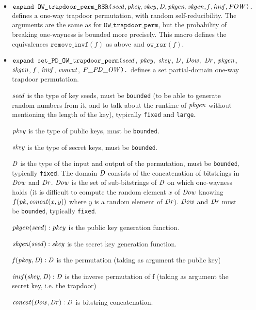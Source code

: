 \documentclass{article}
\begin{document}
\begin{itemize}
\item $\texttt{expand OW\_trapdoor\_perm\_RSR(}\mathit{seed}, \mathit{pkey}, \mathit{skey}, \mathit{D}, \mathit{pkgen}, \mathit{skgen}, \mathit{f}, \mathit{invf}, \mathit{POW}\texttt{).}$ defines a one-way trapdoor permutation, with random self-reducibility. The arguments are the same as for $\texttt{OW\_trapdoor\_perm}$, but the probability of breaking one-wayness is bounded more precisely. This macro defines the equivalences $\texttt{remove\_invf}(f)$ as above and $\texttt{ow\_rsr}(f)$.

\item $\texttt{expand set\_PD\_OW\_trapdoor\_perm(}\mathit{seed}$, $\mathit{pkey}$, $\mathit{skey}$, $\mathit{D}$, $\mathit{Dow}$, $\mathit{Dr}$, $\mathit{pkgen}$, $\mathit{skgen}$, $\mathit{f}$, $\mathit{invf}$, $\mathit{concat}$, $\mathit{P\_PD\_OW}\texttt{).}$ defines a set partial-domain one-way trapdoor permutation.

   $\mathit{seed}$ is the type of key seeds, must be \texttt{bounded} (to be able to generate random numbers from it, and to talk about
  the runtime of $\mathit{pkgen}$ without mentioning the length of the key), typically \texttt{fixed} and \texttt{large}.

   $\mathit{pkey}$ is the type of public keys, must be \texttt{bounded}.

   $\mathit{skey}$ is the type of secret keys, must be \texttt{bounded}.

   $\mathit{D}$ is the type of the input and output of the permutation, must be \texttt{bounded}, typically \texttt{fixed}.
   The domain $\mathit{D}$ consists of the concatenation of bitstrings in $\mathit{Dow}$ and $\mathit{Dr}$.
   $\mathit{Dow}$ is the set of sub-bitstrings of $\mathit{D}$ on which one-wayness holds (it is difficult to compute the
   random element $x$ of $\mathit{Dow}$ knowing $f(\mathit{pk}, \mathit{concat}(x,y))$ where $y$ is a random element of $\mathit{Dr}$).
   $\mathit{Dow}$ and $\mathit{Dr}$ must be \texttt{bounded}, typically \texttt{fixed}.
  
   $\mathit{pkgen}(\mathit{seed}): \mathit{pkey}$ is the public key generation function.

   $\mathit{skgen}(\mathit{seed}): \mathit{skey}$ is the secret key generation function.

   $\mathit{f}(\mathit{pkey}, \mathit{D}):\mathit{D}$ is the permutation (taking as argument the public key)

   $\mathit{invf}(\mathit{skey}, \mathit{D}):\mathit{D}$ is the inverse permutation of f (taking as argument the secret key,
         i.e. the trapdoor)

   $\mathit{concat}(\mathit{Dow}, \mathit{Dr}):\mathit{D}$ is bitstring concatenation.


\end{itemize}
\end{document}
